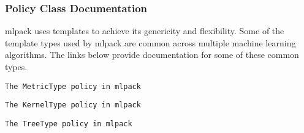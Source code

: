 \subsubsection*{Policy Class Documentation}

mlpack uses templates to achieve its genericity and flexibility. Some of the template types used by mlpack are common across multiple machine learning algorithms. The links below provide documentation for some of these common types.


\begin{DoxyItemize}
\item {\tt The Metric\+Type policy in mlpack}
\item {\tt The Kernel\+Type policy in mlpack}
\item {\tt The Tree\+Type policy in mlpack} 
\end{DoxyItemize}